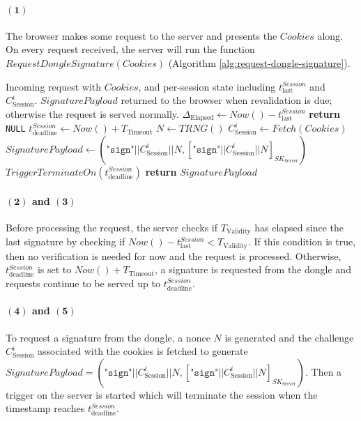 \paragraph{$\boldsymbol{(1)}$} The browser makes some request to the server and presents the $Cookies$ along. On every request received, the server will run the function $RequestDongleSignature(Cookies)$ (Algorithm \ref{alg:request-dongle-signature}). 
\begin{algorithm}[ht!]
\caption{$RequestDongleSignature(Cookies)$}
\begin{algorithmic}[1]
    \Require Incoming request with $Cookies$, and
             per-session state including $t^{Session}_{\text{last}}$ and $C^i_{\text{Session}}$.
    \Ensure  $SignaturePayload$ returned to the browser when revalidation is due;
             otherwise the request is served normally.
    \State $\Delta_\text{Elapsed} \leftarrow Now() - t^{Session}_{\text{last}}$
        \State \textbf{return} \texttt{NULL} 
    \EndIf
    \State $t^{Session}_{\text{deadline}} \leftarrow Now() + T_{\text{Timeout}}$
    \State $N \leftarrow TRNG()$
    \State $C^i_{\text{Session}} \leftarrow Fetch(Cookies)$
    \State $SignaturePayload \leftarrow
            (\texttt{"sign"} || C^i_{\text{Session}} || N,
            [\texttt{"sign"} || C^i_{\text{Session}} || N]_{SK_{\text{Server}}})$
    \State $TriggerTerminateOn(t_\text{deadline}^{Session})$
    \State \textbf{return} $SignaturePayload$
\end{algorithmic}
\label{alg:request-dongle-signature}
\end{algorithm}
\paragraph{$\boldsymbol{(2)}$ and $\boldsymbol{(3)}$} Before processing the request, the server checks if $T_\text{Validity}$ has elapsed since the last signature by checking if $Now() - t_\text{last}^{Session} < T_\text{Validity}$. If this condition is true, then no verification is needed for now and the request is processed. Otherwise, $t_\text{deadline}^{Session}$ is set to $Now() + T_\text{Timeout}$, a signature is requested from the dongle and requests continue to be served up to $t_\text{deadline}^{Session}$.
\paragraph{$\boldsymbol{(4)}$ and $\boldsymbol{(5)}$} To request a signature from the dongle, a nonce $N$ is generated and the challenge $C_\text{Session}^i$ associated with the cookies is fetched to generate $SignaturePayload = (\texttt{"sign"} || C^i_{\text{Session}} || N,
            [\texttt{"sign"} || C^i_{\text{Session}} || N]_{SK_{\text{Server}}})$. Then a trigger on the server is started which will terminate the session when the timestamp reaches $t_\text{deadline}^{Session}$.
